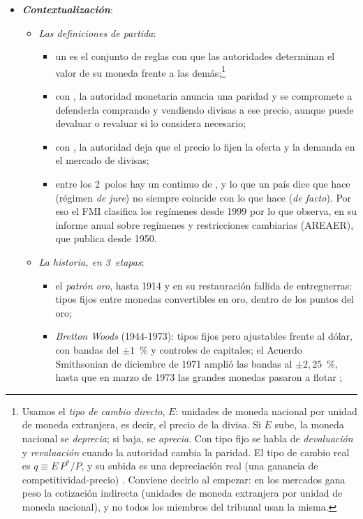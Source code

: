 \documentclass[11pt]{article}
\begin{document}
\begin{itemize}
\item \textbf{\emph{Contextualización}}:
  \begin{itemize}
  \item \emph{Las definiciones de partida}:
    \begin{itemize}
    \item un  es el conjunto de reglas con que las autoridades determinan el valor de su moneda frente a las demás;\footnote{Usamos el \emph{tipo de cambio directo}, $E$: unidades de moneda nacional por unidad de moneda extranjera, es decir, el precio de la divisa. Si $E$ sube, la moneda nacional se \emph{deprecia}; si baja, se \emph{aprecia}. Con tipo fijo se habla de \emph{devaluación} y \emph{revaluación} cuando la autoridad cambia la paridad. El tipo de cambio real es $q\equiv E\,P^*/P$, y su subida es una depreciación real (una ganancia de competitividad-precio) . Conviene decirlo al empezar: en los mercados gana peso la cotización indirecta (unidades de moneda extranjera por unidad de moneda nacional), y no todos los miembros del tribunal usan la misma.}
    \item con , la autoridad monetaria anuncia una paridad y se compromete a defenderla comprando y vendiendo divisas a ese precio, aunque puede devaluar o revaluar si lo considera necesario;
    \item con , la autoridad deja que el precio lo fijen la oferta y la demanda en el mercado de divisas;
    \item entre los 2~polos hay un continuo de , y lo que un país dice que hace (régimen \emph{de jure}) no siempre coincide con lo que hace (\emph{de facto}). Por eso el FMI clasifica los regímenes desde 1999 por lo que observa, en su informe anual sobre regímenes y restricciones cambiarias (AREAER), que publica desde 1950\nocite{FMI2024AREAER2023}.
    \end{itemize}
  \item \emph{La historia, en 3~etapas}:
    \begin{itemize}
    \item el \emph{patrón oro}, hasta 1914 y en su restauración fallida de entreguerras: tipos fijos entre monedas convertibles en oro, dentro de los puntos del oro;
    \item \emph{Bretton Woods} (1944-1973): tipos fijos pero ajustables frente al dólar, con bandas del $\pm1$~\% y controles de capitales; el Acuerdo Smithsonian de diciembre de 1971 amplió las bandas al $\pm2{,}25$~\%, hasta que en marzo de 1973 las grandes monedas pasaron a flotar\nocite{CEA1972ERP} ;

\end{itemize}
\end{itemize}
\end{itemize}
\end{document}
